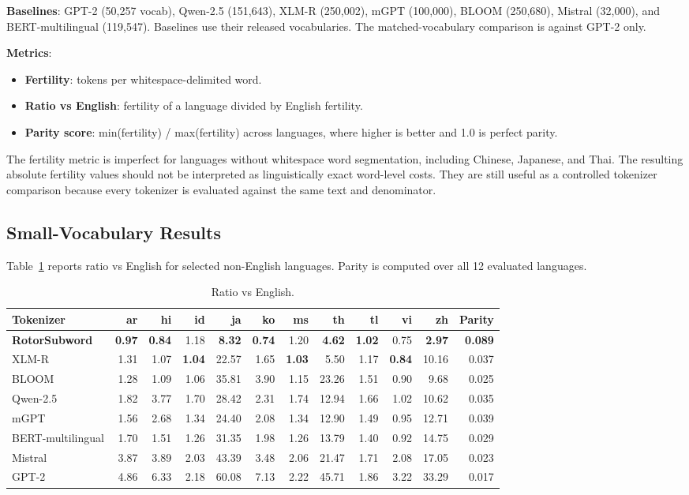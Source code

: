 \documentclass[11pt]{article}
\begin{document}
\textbf{Baselines}: GPT-2 (50,257 vocab), Qwen-2.5 (151,643), XLM-R (250,002), mGPT (100,000), BLOOM (250,680), Mistral (32,000), and BERT-multilingual (119,547). Baselines use their released vocabularies. The matched-vocabulary comparison is against GPT-2 only.

\textbf{Metrics}:
\begin{itemize}
  \item \textbf{Fertility}: tokens per whitespace-delimited word.
  \item \textbf{Ratio vs English}: fertility of a language divided by English fertility.
  \item \textbf{Parity score}: min(fertility) / max(fertility) across languages, where higher is better and 1.0 is perfect parity.
\end{itemize}

The fertility metric is imperfect for languages without whitespace word segmentation, including Chinese, Japanese, and Thai. The resulting absolute fertility values should not be interpreted as linguistically exact word-level costs. They are still useful as a controlled tokenizer comparison because every tokenizer is evaluated against the same text and denominator.

\subsection{Small-Vocabulary Results}

Table~\ref{tab:ratio} reports ratio vs English for selected non-English languages. Parity is computed over all 12 evaluated languages.

\begin{table}[htbp]
\centering
\small
\caption{Ratio vs English.}
\label{tab:ratio}
\begin{tabular}{lrrrrrrrrrrr}
\toprule
Tokenizer & ar & hi & id & ja & ko & ms & th & tl & vi & zh & Parity \\
\midrule
\textbf{RotorSubword} & \textbf{0.97} & \textbf{0.84} & 1.18 & \textbf{8.32} & \textbf{0.74} & 1.20 & \textbf{4.62} & \textbf{1.02} & 0.75 & \textbf{2.97} & \textbf{0.089} \\
XLM-R & 1.31 & 1.07 & \textbf{1.04} & 22.57 & 1.65 & \textbf{1.03} & 5.50 & 1.17 & \textbf{0.84} & 10.16 & 0.037 \\
BLOOM & 1.28 & 1.09 & 1.06 & 35.81 & 3.90 & 1.15 & 23.26 & 1.51 & 0.90 & 9.68 & 0.025 \\
Qwen-2.5 & 1.82 & 3.77 & 1.70 & 28.42 & 2.31 & 1.74 & 12.94 & 1.66 & 1.02 & 10.62 & 0.035 \\
mGPT & 1.56 & 2.68 & 1.34 & 24.40 & 2.08 & 1.34 & 12.90 & 1.49 & 0.95 & 12.71 & 0.039 \\
BERT-multilingual & 1.70 & 1.51 & 1.26 & 31.35 & 1.98 & 1.26 & 13.79 & 1.40 & 0.92 & 14.75 & 0.029 \\
Mistral & 3.87 & 3.89 & 2.03 & 43.39 & 3.48 & 2.06 & 21.47 & 1.71 & 2.08 & 17.05 & 0.023 \\
GPT-2 & 4.86 & 6.33 & 2.18 & 60.08 & 7.13 & 2.22 & 45.71 & 1.86 & 3.22 & 33.29 & 0.017 \\
\bottomrule
\end{tabular}
\end{table}
\end{document}
